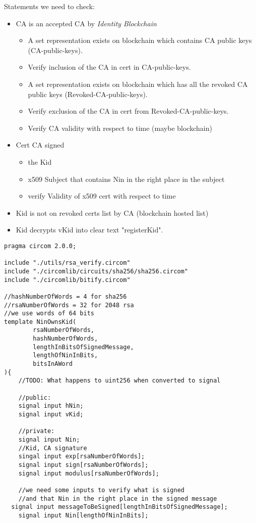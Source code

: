 \documentclass{article}
\newcommand{\pbc}{\textit{Identity Blockchain}}
\begin{document}
\begin{enumerate}[leftmargin=0cm]
Statements we need to check:
\begin{itemize}
	\item CA is an accepted CA by \pbc{}
		\begin{itemize}
			\item A set representation  exists on blockchain which contains CA public keys (CA-public-keys).
			\item Verify inclusion of the CA in cert in CA-public-keys.
			\item A set representation exists on blockchain which has all the revoked CA public keys (Revoked-CA-public-keys).
			\item Verify exclusion of the CA in cert from Revoked-CA-public-keys.
			\item Verify CA validity with respect to time (maybe blockchain)
		\end{itemize}
	\item Cert CA signed 
		\begin{itemize}
			\item the Kid
			\item x509 Subject that contains Nin in the right place in the subject
			\item verify Validity of x509 cert with respect to time
		\end{itemize}
	\item Kid is not on revoked certs list by CA (blockchain hosted list)
	\item Kid decrypts vKid into clear text "registerKid".
\end{itemize}

\begin{lstlisting}[language=circom]
pragma circom 2.0.0;

include "./utils/rsa_verify.circom"
include "./circomlib/circuits/sha256/sha256.circom"
include "./circomlib/bitify.circom"

//hashNumberOfWords = 4 for sha256
//rsaNumberOfWords = 32 for 2048 rsa
//we use words of 64 bits
template NinOwnsKid(
		rsaNumberOfWords, 
		hashNumberOfWords, 
		lengthInBitsOfSignedMessage,
		lengthOfNinInBits,
		bitsInAWord
){
	//TODO: What happens to uint256 when converted to signal

	//public:
	signal input hNin;
	signal input vKid;

	//private:
	signal input Nin;
	//Kid, CA signature
	singal input exp[rsaNumberOfWords];
	signal input sign[rsaNumberOfWords];
	signal input modulus[rsaNumberOfWords];

	//we need some inputs to verify what is signed
	//and that Nin in the right place in the signed message
  signal input messageToBeSigned[lengthInBitsOfSignedMessage];
	signal input Nin[lengthOfNinInBits];


\end{lstlisting}
\end{enumerate}
\end{document}
